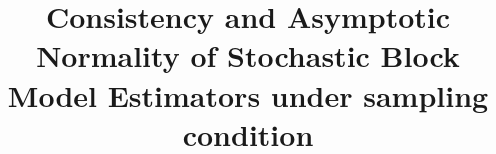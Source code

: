 \documentclass[]{imsart}
\newcommand{\1}{\mathds{1}}
\numberwithin{equation}{section}
\theoremstyle{plain}
\theoremstyle{remark}
\begin{document}
\begin{frontmatter}
\title{Consistency and Asymptotic Normality of Stochastic Block Model Estimators under sampling condition}

% 
% 
% 
% 
% 
% 
% 


\end{frontmatter}
\end{document}
